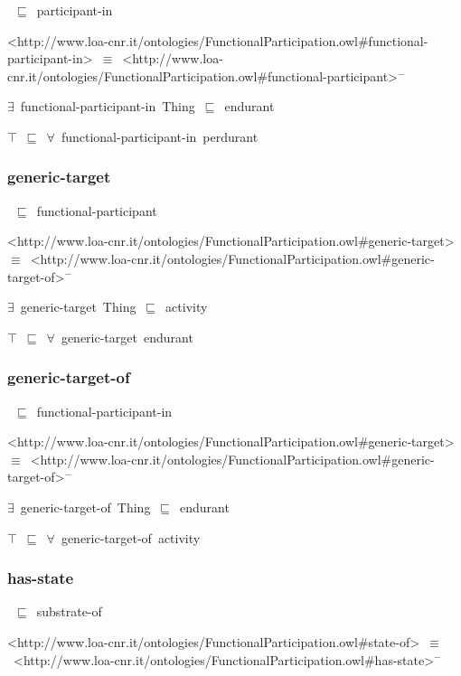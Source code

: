 \documentclass{article}
\begin{document}
~\ensuremath{\sqsubseteq}~participant-in

<http://www.loa-cnr.it/ontologies/FunctionalParticipation.owl#functional-participant-in>~\ensuremath{\equiv}~<http://www.loa-cnr.it/ontologies/FunctionalParticipation.owl#functional-participant>\ensuremath{^-}

\ensuremath{\exists}~functional-participant-in~Thing~\ensuremath{\sqsubseteq}~endurant

\ensuremath{\top}~\ensuremath{\sqsubseteq}~\ensuremath{\forall}~functional-participant-in~perdurant

\subsubsection*{generic-target}

~\ensuremath{\sqsubseteq}~functional-participant

<http://www.loa-cnr.it/ontologies/FunctionalParticipation.owl#generic-target>~\ensuremath{\equiv}~<http://www.loa-cnr.it/ontologies/FunctionalParticipation.owl#generic-target-of>\ensuremath{^-}

\ensuremath{\exists}~generic-target~Thing~\ensuremath{\sqsubseteq}~activity

\ensuremath{\top}~\ensuremath{\sqsubseteq}~\ensuremath{\forall}~generic-target~endurant

\subsubsection*{generic-target-of}

~\ensuremath{\sqsubseteq}~functional-participant-in

<http://www.loa-cnr.it/ontologies/FunctionalParticipation.owl#generic-target>~\ensuremath{\equiv}~<http://www.loa-cnr.it/ontologies/FunctionalParticipation.owl#generic-target-of>\ensuremath{^-}

\ensuremath{\exists}~generic-target-of~Thing~\ensuremath{\sqsubseteq}~endurant

\ensuremath{\top}~\ensuremath{\sqsubseteq}~\ensuremath{\forall}~generic-target-of~activity

\subsubsection*{has-state}

~\ensuremath{\sqsubseteq}~substrate-of

<http://www.loa-cnr.it/ontologies/FunctionalParticipation.owl#state-of>~\ensuremath{\equiv}~<http://www.loa-cnr.it/ontologies/FunctionalParticipation.owl#has-state>\ensuremath{^-}
\end{document}
